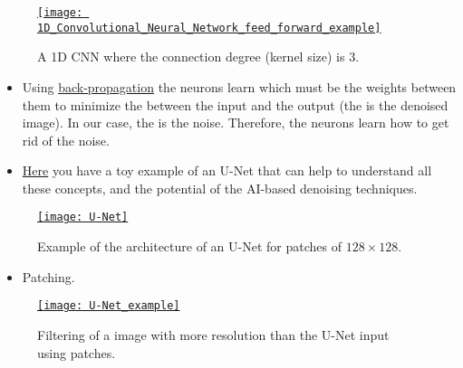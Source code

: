 \begin{figure}[H]
  \vspace{0ex}
  \centering
  \href{https://en.wikipedia.org/wiki/Convolutional_neural_network#/media/File:1D_Convolutional_Neural_Network_feed_forward_example.png}{\texttt{[image: 1D\_Convolutional\_Neural\_Network\_feed\_forward\_example]}}
  \caption{A 1D \gls{CNN} where the connection degree (kernel size) is 3.}
  \label{fig:a_CNN}
\end{figure}

\begin{itemize}
\item Using
  \href{https://en.wikipedia.org/wiki/Backpropagation}{back-propagation}
  the neurons learn which must be the weights between them to minimize
  the  between the input and the output (the
    is the
  denoised image). In our case, the  is the noise. Therefore, the
  neurons learn how to get rid of the noise.
\item
  \href{https://github.com/vicente-gonzalez-ruiz/medical_imaging/blob/main/notebooks/U_Net.ipynb}{Here}
  you have a toy example of an U-Net that can help to understand all
  these concepts, and the potential of the \gls{AI}-based denoising
  techniques.
\end{itemize}

\begin{figure}[H]
  \vspace{0ex}
  \centering
      \href{https://www.linkedin.com/pulse/14-coding-u-net-architecture-from-scratch-riya-chhikara-xbvte}{\texttt{[image: U-Net]}}
  \caption{Example of the architecture of an U-Net for patches of $128\times 128$.}
  \label{fig:UNet}
\end{figure}

\begin{itemize}
\item Patching.
\end{itemize}

\begin{figure}[H]
  \vspace{0ex}
  \centering
  \href{https://www.linkedin.com/pulse/attention-guided-u-net-model-improved-residual-blocks-gokmen}{\texttt{[image: U-Net\_example]}}
  \caption[Patching with an U-Net.]{Filtering of a image with more resolution than the U-Net input using patches.}
  \label{fig:patching}
\end{figure}

